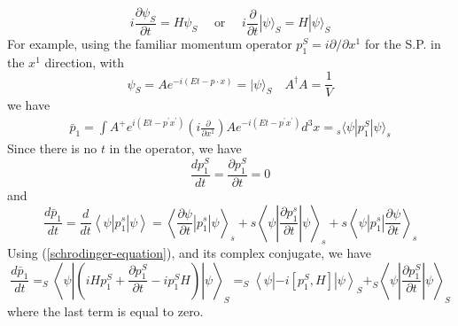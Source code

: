 \begin{equation}
i \frac{\partial \psi_{S}}{\partial t}=H \psi_{S} \quad \text { or } \quad i \frac{\partial}{\partial t}|\psi\rangle_{S}=H|\psi\rangle_{S}
\label{schrodinger-equation}
\end{equation}
 For example, using the familiar momentum operator $p_1^S=i\partial/\partial x^1$ for the S.P. in the $x^1$ direction, with 
$$
\psi_{S}=A e^{-i\left(E t-p\cdot x\right)}=|\psi\rangle_{S} \quad A^{\dagger} A=\frac{1}{V}
$$
we have
$$
\begin{array}{l}
{\bar{p}_{1}=\int A^{+} e^{i\left( Et-p^{\prime}x^{\prime}\right)}\left(i \frac{\partial}{\partial x^{1}}\right) A e^{-i\left(Et-p^{\prime}x^{\prime}\right)} d^{3} x={}_{s}\langle\psi|p_{1}^{S}| \psi\rangle_{s}}
\end{array}
$$
Since there is no $t$ in the operator, we have
$$
\frac{d p_{1}^{S}}{d t}=\frac{\partial p_{1}^{S}}{\partial t}=0
$$
and
\begin{equation}
\frac{d \bar{p}_{1}}{d t}=\frac{d}{d t}\left\langle\psi\left|p_{1}^{s}\right| \psi\right\rangle=\left\langle\frac{\partial \psi}{\partial t}\left|p_{1}^{s}\right| \psi\right\rangle_{s}+s\left\langle\psi\left|\frac{\partial p_{1}^{s}}{\partial t}\right| \psi\right\rangle_{s}+s\left\langle\psi\left|p_{1}^{s}\right| \frac{\partial \psi}{\partial t}\right\rangle_{s}
\end{equation}
Using (\ref{schrodinger-equation}), and its complex conjugate, we have
\begin{equation}
\frac{d \bar{p}_{1}}{d t}=_{S}\left\langle\psi\left|\left(i H p_{1}^{S}+\frac{\partial p_{1}^{S}}{\partial t}-i p_{1}^{S} H\right)\right| \psi\right\rangle_{S}=_{S}\left\langle\psi\left|-i\left[p_{1}^{S}, H\right]\right| \psi\right\rangle_{S}+_{S}\left\langle\psi\left|\frac{\partial p_{1}^{S}}{\partial t}\right| \psi\right\rangle_{S}
\end{equation}
where the last term is equal to zero.

